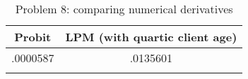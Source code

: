\begin{table}[h!]
\caption{Problem 8: comparing numerical derivatives}
	\label{q8}
\begin{center}
\begin{tabular}{cc}
\toprule
\addlinespace
Probit & LPM (with quartic client age) \\
\hline
\addlinespace
.0000587&.0135601\\ \addlinespace
\bottomrule
\end{tabular}
\end{center}
\end{table}
